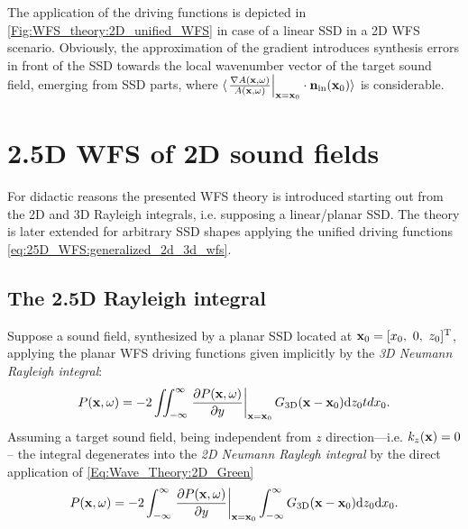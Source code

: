The application of the driving functions is depicted in \ref{Fig:WFS_theory:2D_unified_WFS} in case of a linear SSD in a 2D WFS scenario. Obviously, the approximation of the gradient introduces synthesis errors in front of the SSD towards the local wavenumber vector of the target sound field, emerging from SSD parts, where $\langle \left. \frac{\nabla A(\mathbf{x},\omega)}{A(\mathbf{x},\omega)} \right|_{\mathbf{x} = \mathbf{x}_0}  \cdot \mathbf{n}_{\mathrm{in}}(\mathbf{x}_0) \rangle$ is considerable.

\section{2.5D WFS of 2D sound fields}
For didactic reasons the presented WFS theory is introduced starting out from the 2D and 3D Rayleigh integrals, i.e. supposing a linear/planar SSD. The theory is later extended for arbitrary SSD shapes applying the unified driving functions \eqref{eq:25D_WFS:generalized_2d_3d_wfs}.

\subsection{The 2.5D Rayleigh integral}
Suppose a sound field, synthesized by a planar SSD located at $\mathbf{x}_0 = [x_0,\ 0,\ z_0]^{\mathrm{T}}$, applying the planar WFS driving functions given implicitly by the \emph{3D Neumann Rayleigh integral}:
\begin{equation}
P(\mathbf{x},\omega) = -2\iint_{-\infty}^{\infty} \left. \frac{\partial P(\mathbf{x},\omega)}{\partial y} \right|_{\mathbf{x} = \mathbf{x}_0} G_{3\mathrm{D}}(\mathbf{x}-\mathbf{x}_0) \mathrm{d} z_0 td x_0.
\end{equation}
Assuming a target sound field, being independent from $z$ direction---i.e. $k_z(\mathbf{x}) = 0$-- the integral degenerates into the \emph{2D Neumann Raylegh integral} by the direct application of \eqref{Eq:Wave_Theory:2D_Green}
\begin{equation}
P(\mathbf{x},\omega) = -2\int_{-\infty}^{\infty} \left. \frac{\partial P(\mathbf{x},\omega)}{\partial y} \right|_{\mathbf{x} = \mathbf{x}_0} \int_{-\infty}^{\infty}  G_{3\mathrm{D}}(\mathbf{x}-\mathbf{x}_0) \mathrm{d} z_0 \mathrm{d} x_0.
\label{eq:25D_WFS:2D_neumann} 
\end{equation}


